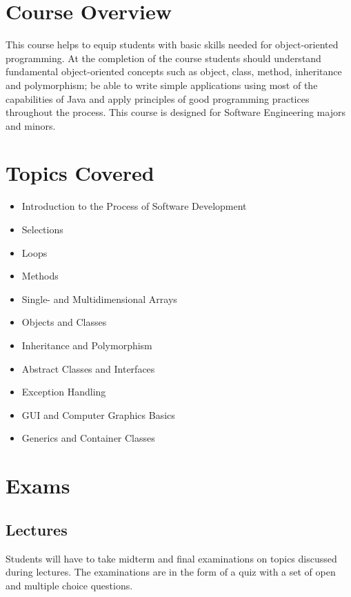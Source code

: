 \documentclass[12pt,a4paper,oneside]{article}
\begin{document}
    \section{Course Overview}

        This course helps to equip students with basic skills needed for
        object-oriented programming. At the completion of the course students
        should understand fundamental object-oriented concepts such as object,
        class, method, inheritance and polymorphism; be able to write simple
        applications using most of the capabilities of Java and apply principles
        of good programming practices throughout the process. This course is
        designed for Software Engineering majors and minors.

    \section{Topics Covered}

        \begin{itemize}
            \item Introduction to the Process of Software Development
            \item Selections
            \item Loops
            \item Methods
            \item Single- and Multidimensional Arrays
            \item Objects and Classes
            \item Inheritance and Polymorphism
            \item Abstract Classes and Interfaces
            \item Exception Handling
            \item GUI and Computer Graphics Basics
            \item Generics and Container Classes
        \end{itemize}

    \section{Exams}

        \subsection{Lectures}

            Students will have to take midterm and final examinations on topics
            discussed during lectures. The examinations are in the form of a
            quiz with a set of open and multiple choice questions.
\end{document}
